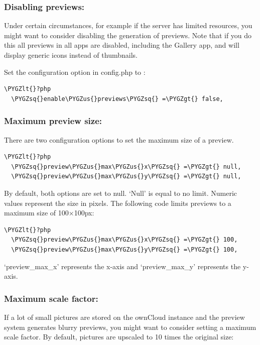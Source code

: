 \documentclass[letterpaper,10pt,english]{sphinxmanual}
\def\PYGZus{\char`\_}
\def\PYGZlt{\char`\<}
\def\PYGZgt{\char`\>}
\def\PYGZsq{\char`\'}
\begin{document}
\subsubsection{Disabling previews:}
\label{configuration_files/previews_configuration:disabling-previews}
Under certain circumstances, for example if the server has limited
resources, you might want to consider disabling the generation of previews.
Note that if you do this all previews in all apps are disabled, including
the Gallery app, and will display generic icons instead of
thumbnails.

Set the configuration option  in config.php to :

\begin{Verbatim}[commandchars=\\\{\}]
\PYGZlt{}?php
  \PYGZsq{}enable\PYGZus{}previews\PYGZsq{} =\PYGZgt{} false,
\end{Verbatim}


\subsubsection{Maximum preview size:}
\label{configuration_files/previews_configuration:maximum-preview-size}
There are two configuration options to set the maximum size of a preview.

\begin{Verbatim}[commandchars=\\\{\}]
\PYGZlt{}?php
  \PYGZsq{}preview\PYGZus{}max\PYGZus{}x\PYGZsq{} =\PYGZgt{} null,
  \PYGZsq{}preview\PYGZus{}max\PYGZus{}y\PYGZsq{} =\PYGZgt{} null,
\end{Verbatim}

By default, both options are set to null. `Null' is equal to no limit.
Numeric values represent the size in pixels. The following code limits previews
to a maximum size of 100×100px:

\begin{Verbatim}[commandchars=\\\{\}]
\PYGZlt{}?php
  \PYGZsq{}preview\PYGZus{}max\PYGZus{}x\PYGZsq{} =\PYGZgt{} 100,
  \PYGZsq{}preview\PYGZus{}max\PYGZus{}y\PYGZsq{} =\PYGZgt{} 100,
\end{Verbatim}

`preview\_max\_x' represents the x-axis and `preview\_max\_y' represents the y-axis.


\subsubsection{Maximum scale factor:}
\label{configuration_files/previews_configuration:maximum-scale-factor}
If a lot of small pictures are stored on the ownCloud instance and the preview
system generates blurry previews, you might want to consider setting a maximum
scale factor. By default, pictures are upscaled to 10 times the original size:
\end{document}
